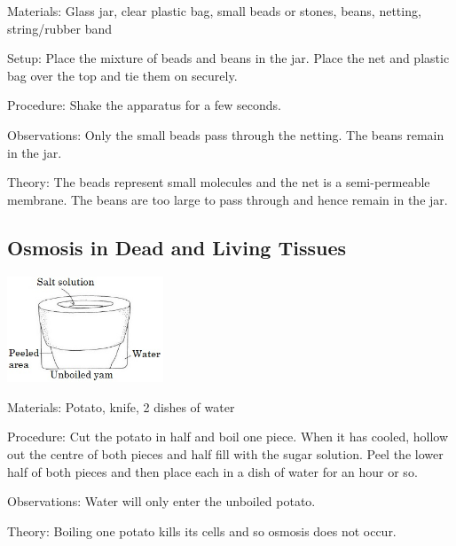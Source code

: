\begin{multicols}{2}
\begin{description*}
\item[Materials:]{Glass jar, clear plastic bag, small beads or stones, beans, netting, string/rubber band}
\item[Setup:]{Place the mixture of beads and beans in the jar. Place the net and plastic bag over the top and tie them on securely.}
\item[Procedure:]{Shake the apparatus for a few seconds.}
\item[Observations:]{Only the small beads pass through the netting. The beans remain in the jar.}
\item[Theory:]{The beads represent small molecules and the net is a semi-permeable membrane. The beans are too large to pass through and hence remain in the jar.}
\end{description*}

\subsection{Osmosis in Dead and Living Tissues}

\begin{center}
\includegraphics[width=0.35\textwidth]{./img/vso/osmosis-dead-living.jpg}
\end{center}

\begin{description*}
\item[Materials:]{Potato, knife, 2 dishes of water}
\item[Procedure:]{Cut the potato in half
and boil one piece. When it has
cooled, hollow out the centre of
both pieces and half fill
with the sugar solution.
Peel the lower half of both
pieces and then place each in a dish of water for an hour or so.}
\item[Observations:]{Water will only enter the unboiled potato.}
\item[Theory:]{Boiling one potato kills its cells and so osmosis does not occur.}
\end{description*}


\end{multicols}
